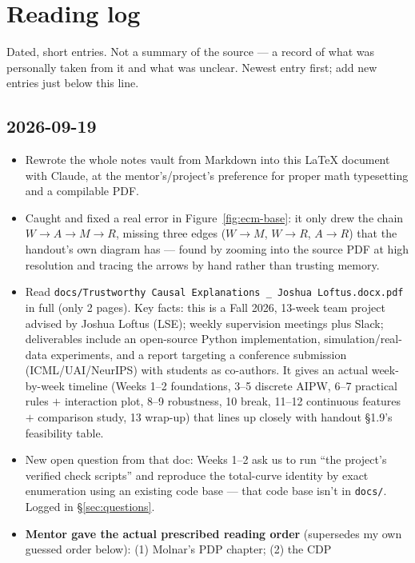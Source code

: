 \section{Reading log}
\label{sec:reading-log}

Dated, short entries. Not a summary of the source --- a record of what was
personally taken from it and what was unclear. Newest entry first; add new
entries just below this line.

\subsection*{2026-09-19}
\begin{itemize}
  \item Rewrote the whole notes vault from Markdown into this \LaTeX{}
    document with Claude, at the mentor's/project's preference for proper
    math typesetting and a compilable PDF.
  \item Caught and fixed a real error in Figure~\ref{fig:ecm-base}: it only
    drew the chain $W\to A\to M\to R$, missing three edges
    ($W\to M$, $W \to R$, $A \to R$) that the handout's own diagram has ---
    found by zooming into the source PDF at high resolution and tracing the
    arrows by hand rather than trusting memory.
  \item Read \texttt{docs/Trustworthy Causal Explanations \_ Joshua Loftus.docx.pdf}
    in full (only 2 pages). Key facts: this is a Fall 2026, 13-week
    team project advised by Joshua Loftus (LSE); weekly supervision meetings
    plus Slack; deliverables include an open-source Python implementation,
    simulation/real-data experiments, and a report targeting a conference
    submission (ICML/UAI/NeurIPS) with students as co-authors. It gives an
    actual week-by-week timeline (Weeks 1--2 foundations, 3--5 discrete
    AIPW, 6--7 practical rules $+$ interaction plot, 8--9 robustness, 10
    break, 11--12 continuous features $+$ comparison study, 13 wrap-up) that
    lines up closely with handout \S1.9's feasibility table.
  \item New open question from that doc: Weeks 1--2 ask us to run ``the
    project's verified check scripts'' and reproduce the total-curve
    identity by exact enumeration using an existing code base --- that code
    base isn't in \texttt{docs/}. Logged in \S\ref{sec:questions}.
  \item \textbf{Mentor gave the actual prescribed reading order} (supersedes
    my own guessed order below): (1) Molnar's PDP chapter; (2) the CDP

\end{itemize}
